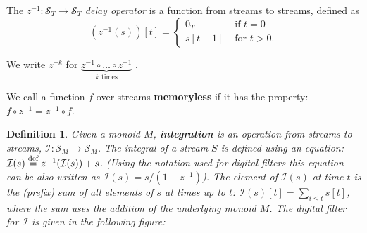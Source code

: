 \documentclass[10pt]{article}
\newtheorem{definition}{Definition}[section]
\newcommand{\stream}[1]{\ensuremath{\mathcal{S}_{#1}}}
\newcommand{\zm}{\ensuremath{z^{-1}}} %
\newcommand{\I}{\mathcal{I}}  %
\newcommand{\defn}{\stackrel{\textrm{\scriptsize def}}{=}}
\begin{document}
The $\zm: \stream{T} \rightarrow \stream{T}$ \emph{delay operator} is
a function from streams to streams, defined as
$$(\zm(s))[t] = \left\{
\begin{array}{ll}
  0_T & \mbox{ if } t = 0 \\
  s[t - 1] & \mbox{ for } t > 0.
\end{array}
\right.
$$


We write $z^{-k}$ for $\underbrace{\zm \circ \ldots \circ \zm}_{k
  \mbox{ times}}$ .

We call a function $f$ over streams \textbf{memoryless} if it has the
property: $f \circ \zm = \zm \circ f$.

\begin{definition}
Given a monoid $M$, \textbf{integration} is an operation from streams to
streams, $\I : \stream{M} \rightarrow \stream{M}$.  The integral of a
stream $S$ is defined using an equation: $\I(s) \defn \zm(\I(s)) + s$.
(Using the notation used for digital filters this equation can be also
written as $\I(s) = s / (1 - \zm)$).  The element of $\I(s)$ at time
$t$ is the (prefix) sum of all elements of $s$ at times up to $t$:
$\I(s)[t] = \sum_{i \leq t} s[t]$, where the sum uses the addition of
the underlying monoid $M$.  The digital filter for $\I$ is given in
the following figure:

\end{definition}
\end{document}
